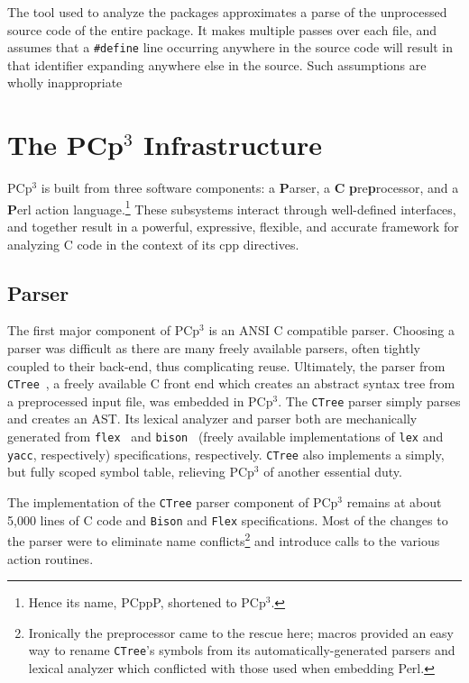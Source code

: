 \documentclass{article}
\newcommand{\pcp}{\mbox{\textsf{PCp}$^3$}}
\newcommand{\pcppp}{\mbox{\textsf{PCppP}}}
\newcommand{\Cpp}{\mbox{\textsf{cpp}}}
\newcommand{\Perl}{\mbox{\textsf{Perl}}}
\newcommand{\C}{\mbox{\textsf{C}}}
\newcommand{\ppd}[1]{\texttt{\##1}}
\begin{document}
The tool used to analyze the packages approximates a parse of the
unprocessed source code of the entire package.  It makes multiple passes
over each file, and assumes that a \ppd{define} line occurring anywhere
in the source code will result in that identifier expanding anywhere
else in the source.  Such assumptions are wholly inappropriate 

\section{The \pcp{} Infrastructure}
\label{sec:pcp3}
\pcp{} is built from three software components: a \textbf{\textsf{P}}arser, a \textbf{\textsf{C}}
\textbf{\textsf{p}}re\textbf{\textsf{p}}rocessor, and a \textbf{\textsf{P}}erl action
language.\footnote{Hence its name, \pcppp{}, shortened to \pcp{}.}
These subsystems interact through well-defined interfaces, and together
result in a powerful, expressive, flexible, and accurate framework for
analyzing \C{} code in the context of its \Cpp{} directives.

\subsection{Parser}

The first major component of \pcp{} is an ANSI \C{} compatible parser.
Choosing a parser was difficult as there are many freely available
parsers, often tightly coupled to their back-end, thus complicating
reuse.  Ultimately, the parser from \texttt{CTree}~\cite{CTree}, a
freely available \C{} front end which creates an abstract syntax tree
from a preprocessed input file, was embedded in \pcp{}.  The
\texttt{CTree} parser simply parses and creates an AST.  Its lexical analyzer and
parser both are mechanically generated from
\texttt{flex}~\cite{Flex,Levine92} and
\texttt{bison}~\cite{Bison,Levine92} (freely available implementations
of \texttt{lex} and \texttt{yacc}, respectively) specifications,
respectively.  \texttt{CTree} also implements a simply, but fully scoped
symbol table, relieving \pcp{} of another essential duty.

The implementation of the \texttt{CTree} parser component of \pcp{}
remains at about 5,000 lines of \C{} code and \texttt{Bison} and
\texttt{Flex} specifications.  Most of the changes to the parser were to
eliminate name conflicts\footnote{Ironically the preprocessor came to the
  rescue here; macros provided an easy way to rename \texttt{CTree}'s
  symbols from its automatically-generated parsers and lexical analyzer
  which conflicted with those used when embedding \Perl{}.}  and
introduce calls to the various action routines.
\end{document}
